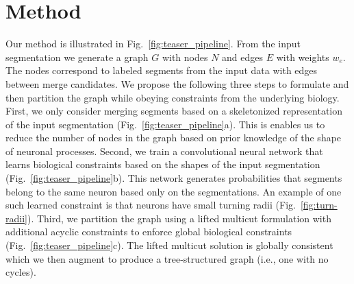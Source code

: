
\section{Method}


Our method is illustrated in Fig.~\ref{fig:teaser_pipeline}.
From the input segmentation we generate a graph $G$ with nodes $N$ and edges $E$ with weights $w_e$. 
The nodes correspond to labeled segments from the input data with edges between merge candidates.
We propose the following three steps to formulate and then partition the graph while obeying constraints from the underlying biology.
First, we only consider merging segments based on a skeletonized representation of the input segmentation (Fig.~\ref{fig:teaser_pipeline}a).
This is enables us to reduce the number of nodes in the graph based on prior knowledge of the shape of neuronal processes.
Second, we train a convolutional neural network that learns biological constraints based on the shapes of the input segmentation (Fig.~\ref{fig:teaser_pipeline}b).
This network generates probabilities that segments belong to the same neuron based only on the segmentations. 
An example of one such learned constraint is that neurons have small turning radii (Fig.~\ref{fig:turn-radii}).
Third, we partition the graph using a lifted multicut formulation with additional acyclic constraints to enforce global biological constraints (Fig.~\ref{fig:teaser_pipeline}c).
The lifted multicut solution is globally consistent which we then augment to produce a tree-structured graph (i.e., one with no cycles).

